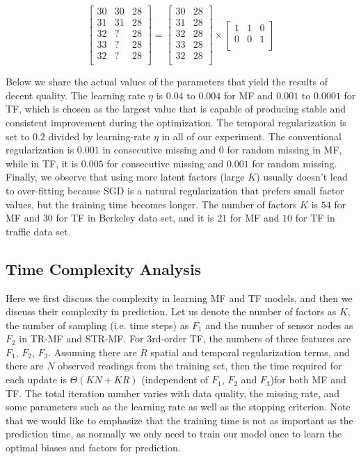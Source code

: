 \begin{equation}
\label{temporalSplit_matrix}
\begin{bmatrix}
30 & 30 & 28\\
31 & 31 & 28\\
32 &  ? & 28\\
33 &  ? & 28\\
32 &  ? & 28\\
\end{bmatrix} 
= 
\begin{bmatrix}
30 & 28\\
31 & 28\\
32 & 28\\
33 & 28\\
32 & 28\\
\end{bmatrix} 
\times
\begin{bmatrix}
1 & 1 & 0\\
0 & 0 & 1\\
\end{bmatrix} 
\end{equation}

Below we share the actual values of the parameters that yield the results of decent quality.
The learning rate $\eta$ is $0.04$ to $0.004$ for MF and $0.001$ to $0.0001$ for TF, which is chosen as the largest value that is capable of producing stable and consistent improvement during the optimization.
The temporal regularization is set to $0.2$ divided by learning-rate $\eta$ in all of our experiment.
The conventional regularization is $0.001$ in consecutive missing and $0$ for random missing in MF, while in TF, it is $0.005$ for consecutive missing and $0.001$ for random missing.
Finally, we observe that using more latent factors (large $K$) usually doesn't lead to over-fitting because SGD is a natural regularization that prefers small factor values, but the training time becomes longer.
The number of factors $K$ is $54$ for MF and $30$ for TF in Berkeley data set, and it is $21$ for MF and $10$ for TF in traffic data set. 

\subsection{Time Complexity Analysis}
Here we first discuss the complexity in learning MF and TF models, and then we discuss their complexity in prediction.
Let us denote the number of factors as $K$, the number of sampling (i.e. time steps) as $F_1$ and the number of sensor nodes as $F_2$ in TR-MF and STR-MF. For 3rd-order TF, the numbers of three features are $F_1$, $F_2$, $F_3$.  
Assuming there are $R$ spatial and temporal regularization terms, and there are $N$ observed readings from the training set, then the time required for each update is $\Theta(KN + KR)$ (independent of $F_1$, $F_2$ and $F_3$)for both MF and TF.
The total iteration number varies with data quality, the missing rate, and some parameters such as the learning rate as well as the stopping criterion. 
Note that we would like to emphasize that the training time is not as important as the prediction time, as normally we only need to train our model once to learn the optimal biases and factors for prediction.

